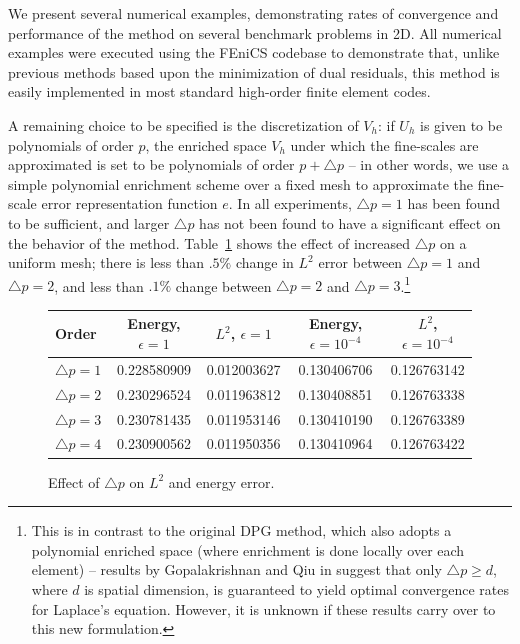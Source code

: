 \documentclass[final,leqno]{siamltex}
\begin{document}
We present several numerical examples, demonstrating rates of convergence and performance of the method on several benchmark problems in 2D.  All numerical examples were executed using the %
 FEniCS codebase \cite{LoggMardalEtAl2012a} to demonstrate that, unlike previous methods based upon the minimization of dual residuals, this method is easily implemented in most standard high-order finite element codes.  

A remaining choice to be specified is the discretization of $V_h$: if $U_h$ is given to be polynomials of order $p$, the enriched space $V_h$ under which the fine-scales are approximated is set to be polynomials of order $p+\triangle p$ -- in other words, we use a simple polynomial enrichment scheme over a fixed mesh to approximate the fine-scale error representation function $e$.  In all experiments, $\triangle p = 1$ has been found to be sufficient, and larger $\triangle p$ has not been found to have a significant effect on the behavior of the method.  Table~\ref{tab:dp} shows the effect of increased $\triangle p$ on a uniform mesh; there is less than $.5\%$ change in $L^2$ error between $\triangle p = 1$ and $\triangle p=2$, and less than $.1\%$ change between $\triangle p=2$ and $\triangle p = 3$.\footnote{This is in contrast to the original DPG method, which also adopts a polynomial enriched space (where enrichment is done locally over each element) -- results by Gopalakrishnan and Qiu in \cite{practicalDPG} suggest that only $\triangle p \geq d$, where $d$ is spatial dimension, is guaranteed to yield optimal convergence rates for Laplace's equation. However, it is unknown if these results carry over to this new formulation.}


\begin{figure}[!h]
\centering
  \begin{tabular}{| l || c | c | c | c| }
   \hline
    Order & Energy, $\epsilon=1$ & $L^2$, $\epsilon=1$  & Energy, $\epsilon=10^{-4}$ & $L^2$, $\epsilon=10^{-4}$\\
    \hline
    $\triangle p=1$ & 0.228580909 &  0.012003627 & 0.130406706 & 0.126763142
    \\ \hline
    $\triangle p=2$ &    0.230296524 &  0.011963812 & 0.130408851&    0.126763338
    \\ \hline
    $\triangle p=3$ &     0.230781435 & 0.011953146  &    0.130410190 &   0.126763389
    \\ \hline
    $\triangle p=4$ &    0.230900562 &  0.011950356 &   0.130410964 &  0.126763422
    \\ \hline
    \hline
  \end{tabular}
\caption{Effect of $\triangle p$ on $L^2$ and energy error.}
\label{tab:dp}
\end{figure}
\end{document}
